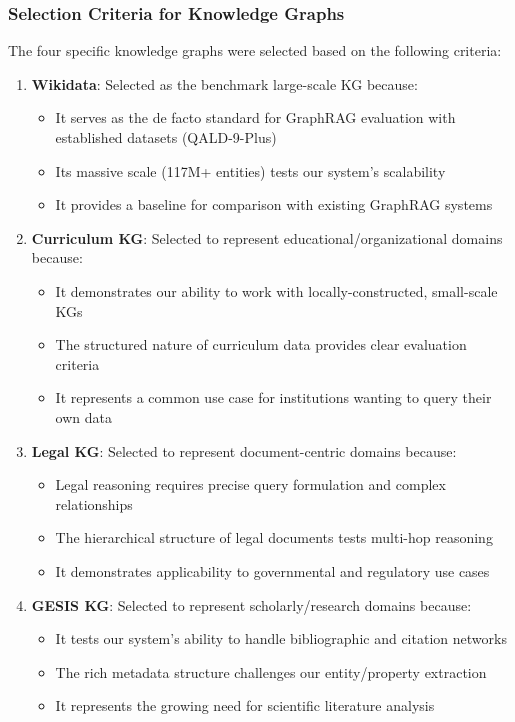 \subsubsection{Selection Criteria for Knowledge Graphs}

The four specific knowledge graphs were selected based on the following criteria:

\begin{enumerate}
    \item \textbf{Wikidata}: Selected as the benchmark large-scale KG because:
    \begin{itemize}
        \item It serves as the de facto standard for GraphRAG evaluation with established datasets (QALD-9-Plus)
        \item Its massive scale (117M+ entities) tests our system's scalability
        \item It provides a baseline for comparison with existing GraphRAG systems
    \end{itemize}
    
    \item \textbf{Curriculum KG}: Selected to represent educational/organizational domains because:
    \begin{itemize}
        \item It demonstrates our ability to work with locally-constructed, small-scale KGs
        \item The structured nature of curriculum data provides clear evaluation criteria
        \item It represents a common use case for institutions wanting to query their own data
    \end{itemize}
    
    \item \textbf{Legal KG}: Selected to represent document-centric domains because:
    \begin{itemize}
        \item Legal reasoning requires precise query formulation and complex relationships
        \item The hierarchical structure of legal documents tests multi-hop reasoning
        \item It demonstrates applicability to governmental and regulatory use cases
    \end{itemize}
    
    \item \textbf{GESIS KG}: Selected to represent scholarly/research domains because:
    \begin{itemize}
        \item It tests our system's ability to handle bibliographic and citation networks
        \item The rich metadata structure challenges our entity/property extraction
        \item It represents the growing need for scientific literature analysis
    \end{itemize}
\end{enumerate}

